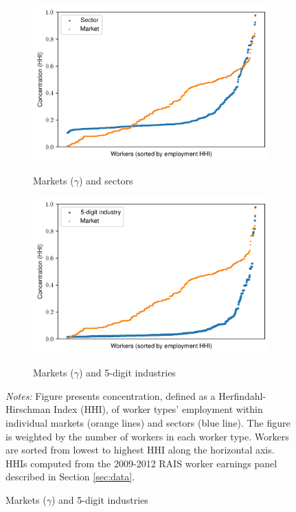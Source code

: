 \documentclass[12pt]{article}
\def\g{\gamma}
\def\i{\iota}
\theoremstyle{definition}
\theoremstyle{plain}
\begin{document}
\begin{figure}
	\centering
	\caption{Concentration of Worker Types' ($\i$) Employment Within Markets/Sectors}
	\begin{subfigure}{\textwidth}
		\centering
		\caption{Markets ($\g$) and sectors}
		\includegraphics[width=0.8\linewidth]{../Results/concentration_figures_iota_gamma_sector_hhi_worker_weighted}
		\label{fig:concentration_figures_iota_gamma_sector_hhi_worker_weighted}
	\end{subfigure}
	\begin{subfigure}{\textwidth}
		\centering
		\caption{Markets ($\g$) and 5-digit industries}
		\includegraphics[width=0.8\linewidth]{../Results/concentration_figures_iota_gamma_sector5_hhi_worker_weighted}
		\label{fig:concentration_figures_iota_gamma_sector5_hhi_worker_weighted}
	\end{subfigure}
	\label{fig:concentration_figures_iota_gamma_hhi}
	\footnotesize\flushleft \emph{Notes:} Figure presents concentration, defined as a Herfindahl-Hirschman Index (HHI), of worker types' employment within individual markets (orange lines) and sectors (blue line). The figure is weighted by the number of workers in each worker type. Workers are sorted from lowest to highest HHI along the horizontal axis. HHIs computed from the 2009-2012 RAIS worker earnings panel described in Section \ref{sec:data}.
\end{figure}
\end{document}
